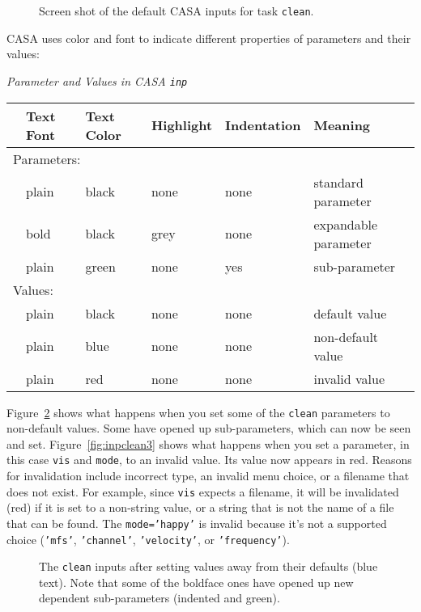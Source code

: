 \begin{figure}[h!]
\begin{center}
\caption{\label{fig:inpclean1} Screen shot of the default CASA inputs
for task {\tt clean}.}
\hrulefill
\end{center}
\end{figure}

CASA uses color and font to indicate different properties of
parameters and their values:
\begin{center}
{\it Parameter and Values in CASA {\tt inp}}\\[5mm]
\begin{tabular}{|l|l|l|l|l|l|}
\hline
  & Text Font & Text Color & Highlight & Indentation & Meaning \\
\hline
\multicolumn{6}{|l|}{Parameters:}\\
\hline
  & plain & black & none & none & standard parameter \\
  & bold  & black & grey & none & expandable parameter \\
  & plain & green & none & yes & sub-parameter \\
\hline
\multicolumn{6}{|l|}{Values:}\\
\hline
  & plain & black & none & none & default value \\
  & plain & blue & none & none & non-default value \\
  & plain & red & none & none & invalid value \\
\hline
\end{tabular}
\end{center}

Figure~\ref{fig:inpclean2} shows what happens when you set some of the
{\tt clean} parameters to non-default values.  Some have
opened up sub-parameters, which can now be seen and set.
Figure~\ref{fig:inpclean3} shows what happens when you set a
parameter, in this case {\tt vis} and {\tt mode}, to an invalid value.  
Its value now appears in red.  Reasons for invalidation include
incorrect type, an invalid menu choice, or a filename that does not
exist.  For example, since {\tt vis} expects a
filename, it will be invalidated (red) if it is set to a non-string
value, or a string that is not the name of a file that can be found.
The {\tt mode='happy'} is invalid because it's not a supported choice
({\tt'mfs'}, {\tt'channel'}, {\tt'velocity'}, or {\tt'frequency'}).

\begin{figure}[h]
\begin{center}
\caption{\label{fig:inpclean2} The {\tt clean} inputs after
setting values away from their defaults (blue text).
Note that some of the boldface ones have opened up new 
dependent sub-parameters (indented and green).
}
\hrulefill
\end{center}
\end{figure}

